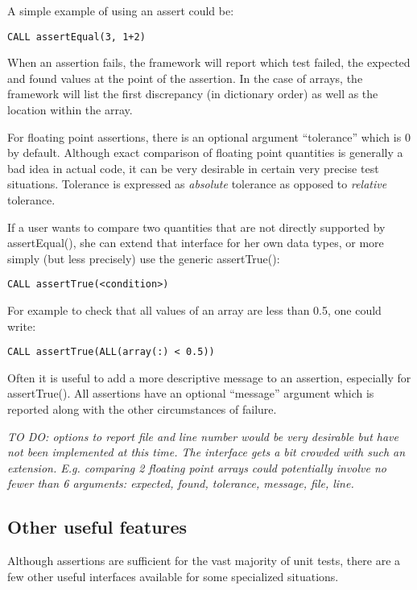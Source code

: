 \documentclass[10pt]{article}
\begin{document}
A simple example of using an assert could be:
\begin{verbatim}
CALL assertEqual(3, 1+2)
\end{verbatim}

When an assertion fails, the framework will report which test failed,
the expected and found values at the point of the assertion.  In the
case of arrays, the framework will list the first discrepancy (in
dictionary order) as well as the location within the array.

For floating point assertions, there is an optional argument
``tolerance'' which is 0 by default.  Although exact comparison of
floating point quantities is generally a bad idea in actual code, it
can be very desirable in certain very precise test situations.
Tolerance is expressed as \emph{absolute} tolerance as opposed to
\emph{relative} tolerance.



If a user wants to compare two quantities that are not directly
supported by assertEqual(), she can extend that interface for her own
data types, or more simply (but less precisely) use the generic assertTrue():

\begin{verbatim}
CALL assertTrue(<condition>)
\end{verbatim}

For example to check that all values of an array are less than 0.5, one could write:
\begin{verbatim}
CALL assertTrue(ALL(array(:) < 0.5))
\end{verbatim}

Often it is useful to add a more descriptive message to an assertion,
especially for assertTrue().  All assertions have an optional
``message'' argument which is reported along with the other circumstances of failure.

\emph{TO DO: options to report file and line number would be very
  desirable but have not been implemented at this time.  The interface
  gets a bit crowded with such an extension.  E.g.  comparing 2
  floating point arrays could potentially involve no fewer than 6
  arguments: expected, found, tolerance, message, file, line.  }

\subsection{Other useful features}
Although assertions are sufficient for the vast majority of unit
tests, there are a few other useful interfaces available for some specialized situations.
\end{document}
